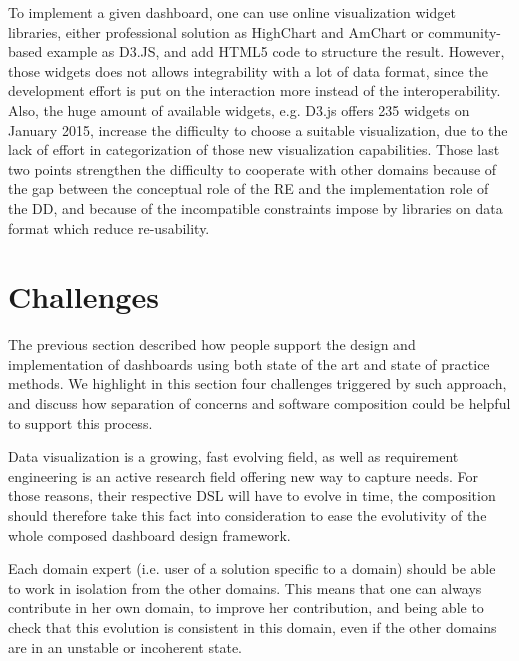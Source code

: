 \documentclass{acm_proc_article-sp}
\begin{document}
To implement a given dashboard, one can use online visualization widget
libraries, either professional solution as HighChart and AmChart or
community-based example as D3.JS, and add HTML5 code to structure the
result.
However, those widgets does not allows integrability with a lot of data format,
since the development effort is put on the interaction more instead of the interoperability.
Also, the huge amount of available widgets, e.g. D3.js offers 235 widgets on
January 2015, increase the difficulty to choose a suitable visualization,
due to the lack of effort in categorization of those new visualization
capabilities\cite{ecmfa}.
Those last two points strengthen the difficulty to cooperate with other domains
because of the gap between the conceptual role of the RE and the implementation
role of the DD, and because of the incompatible constraints impose by libraries
on data format which reduce re-usability.

\section{Challenges}

The previous section described how people support the design and
implementation of dashboards using both state of the art and state of
practice methods. We highlight in this section four challenges
triggered by such approach, and discuss how separation of concerns and
software composition could be helpful to support this process.


Data visualization is a growing, fast evolving field, as well as
requirement engineering is an active research field offering new way
to capture needs.  For those reasons, their respective DSL will have
to evolve in time, the composition should therefore take this fact
into consideration to ease the evolutivity of the whole composed
dashboard design framework.

Each domain expert (i.e. user of a solution specific to a domain)
should be able to work in isolation from the other domains. This means
that one can always contribute in her own domain, to improve her
contribution, and being able to check that this evolution is
consistent in this domain, even if the other domains are in an
unstable or incoherent state.
\end{document}
